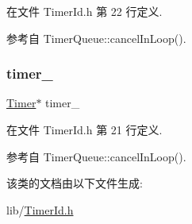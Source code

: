 在文件 Timer\+Id.\+h 第 22 行定义.



参考自 Timer\+Queue\+::cancel\+In\+Loop().

\mbox{\label{classmuduo_1_1TimerId_ae667852d5ad62e431751ceb013368cb9}} 
\subsubsection{\texorpdfstring{timer\+\_\+}{timer\_}}
{\footnotesize\ttfamily \hyperlink{classmuduo_1_1Timer}{Timer}$\ast$ timer\+\_\+\hspace{0.3cm}{\ttfamily [private]}}



在文件 Timer\+Id.\+h 第 21 行定义.



参考自 Timer\+Queue\+::cancel\+In\+Loop().



该类的文档由以下文件生成\+:\begin{DoxyCompactItemize}
\item 
lib/\hyperlink{TimerId_8h}{Timer\+Id.\+h}\end{DoxyCompactItemize}
